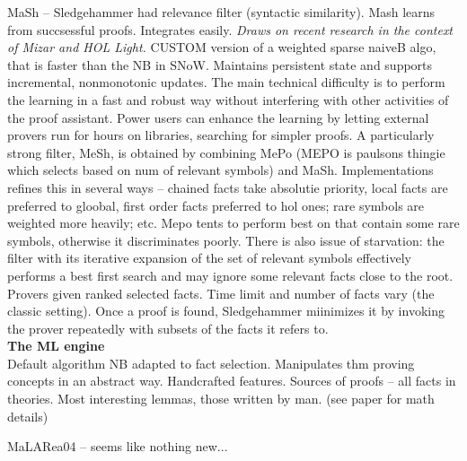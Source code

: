 \documentclass{article}
\begin{document}
MaSh \cite{MaSh} -- Sledgehammer had relevance filter (syntactic similarity).
Mash learns from succsessful proofs. Integrates easily. \emph{Draws on recent
research in the context of Mizar and HOL Light.} CUSTOM version of a weighted
sparse naiveB algo, that is faster than the NB in SNoW. Maintains persistent
state and supports incremental, nonmonotonic updates.  The main technical
difficulty is to perform the learning in a fast and robust way without
interfering with other activities of the proof assistant. Power users can
enhance the learning by letting external provers run for hours on libraries,
searching for simpler proofs. A particularly strong filter, MeSh, is obtained
by combining MePo (MEPO is paulsons thingie which selects based on num of
relevant symbols) and MaSh. Implementations refines this in several ways --
chained facts take absolutie priority, local facts are preferred to gloobal,
first order facts preferred to hol ones; rare symbols are weighted more
heavily; etc. Mepo tents to perform best on that contain some rare symbols,
otherwise it discriminates poorly. There is also issue of starvation: the
filter with its iterative expansion of the set of relevant symbols effectively
performs a best first search and may ignore some relevant facts close to the
root. Provers given ranked selected facts. Time limit and number of facts vary
(the classic setting). Once a proof is found, Sledgehammer miinimizes it by
invoking the prover repeatedly with subsets of the facts it refers to. 
\\\textbf{The ML engine}\\
Default algorithm NB adapted to fact selection. Manipulates thm proving
concepts in an abstract way. Handcrafted features. Sources of proofs -- all
facts in theories. Most interesting lemmas, those written by man. (see paper
for math details)

MaLARea04 \cite{MaLARea04} -- seems like nothing new...






\end{document}
